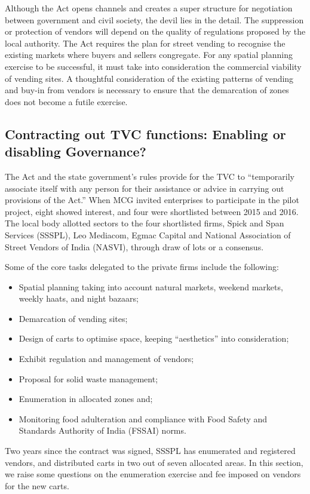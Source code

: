 \documentclass[a4paper, 12pt, twoside]{article}
\begin{document}
Although the Act opens channels and creates a super structure for negotiation between government and civil society, the devil lies in the detail. The suppression or protection of vendors will depend on the quality of regulations proposed by the local authority. The Act requires the plan for street vending to recognise the existing markets where buyers and sellers congregate. For any spatial planning exercise to be successful, it must take into consideration the commercial viability of vending sites. A thoughtful consideration of the existing patterns of vending and buy-in from vendors is necessary to ensure that the demarcation of zones does not become a futile exercise.

\subsection{Contracting out TVC functions: Enabling or disabling Governance?}

The Act and the state government’s rules provide for the TVC to “temporarily associate itself with any person for their assistance or advice in carrying out provisions of the Act.” When MCG invited enterprises to participate in the pilot project, eight showed interest, and four were shortlisted between 2015 and 2016. The local body allotted sectors to the four shortlisted firms,  Spick and Span Services (SSSPL), Leo Mediacom, Egmac Capital and National Association of Street Vendors of India (NASVI), through draw of lots or a consensus. 

Some of the core tasks delegated to the private firms include the following: 
\begin{itemize}
\item Spatial planning taking into account natural markets, weekend markets, weekly haats, and night bazaars;
\item Demarcation of vending sites;
\item Design of carts to optimise space, keeping “aesthetics” into consideration;
\item Exhibit regulation and management of vendors;
\item Proposal for solid waste management;
\item Enumeration in allocated zones and;
\item Monitoring food adulteration and compliance with Food Safety and Standards Authority of India (FSSAI) norms.
\end{itemize}

Two years since the contract was signed, SSSPL has enumerated and registered vendors, and distributed carts in two out of seven allocated areas. In this section, we raise some questions on the enumeration exercise and fee imposed on vendors for the new carts. 
\end{document}
